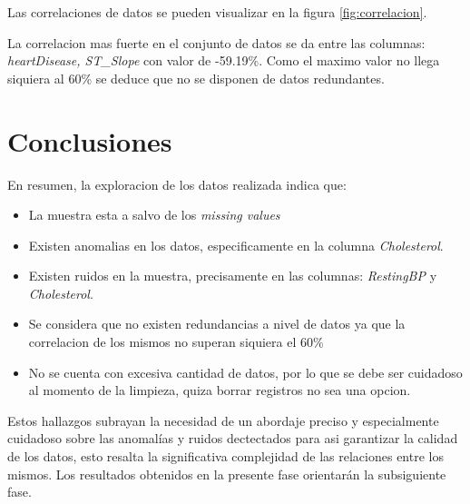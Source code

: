 \documentclass[12pt, letterpaper]{article}
\begin{document}
Las correlaciones de datos se pueden visualizar en la figura \ref{fig:correlacion}.


La correlacion mas fuerte en el conjunto de datos se da entre las 
columnas: \textit{heartDisease, ST\_Slope} con valor de -59.19\%.
Como el maximo valor no llega siquiera al 60\% se deduce que no se disponen de datos redundantes.

\newpage
\section{Conclusiones}
En resumen, la exploracion de los datos realizada indica que:
\begin{itemize}
    \item{La muestra esta a salvo de los \textit{missing values}}
    \item{Existen anomalias en los datos, especificamente en la columna \textit{Cholesterol}.}
    \item{Existen ruidos en la muestra, precisamente en las columnas: \textit{RestingBP}
    y \textit{Cholesterol}.}
    \item{Se considera que no existen redundancias a nivel de datos ya que la correlacion
    de los mismos no superan siquiera el 60\%}
    \item{No se cuenta con excesiva cantidad de datos, por lo que se debe ser cuidadoso
    al momento de la limpieza, quiza borrar registros no sea una opcion.}
\end{itemize}
Estos hallazgos subrayan la necesidad de un abordaje preciso y especialmente cuidadoso 
sobre las anomalías y ruidos dectectados para asi garantizar la calidad de los datos, 
esto resalta la significativa complejidad de las relaciones entre los mismos. 
Los resultados obtenidos en la presente fase orientarán la subsiguiente fase.

\newpage
\printbibliography
\end{document}
